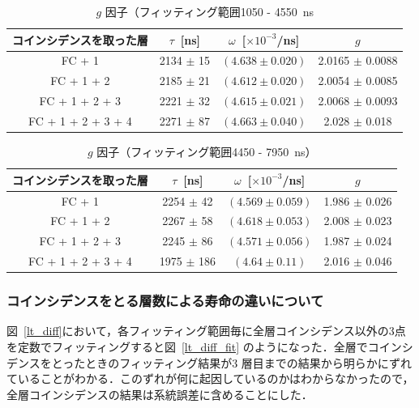 \begin{table}[H]
\caption{$g$ 因子（フィッティング範囲1050 - 4550~ns }
\label{fitrange3}
\centering
\begin{tabular}{cccc}\toprule
コインシデンスを取った層 & $\tau$~[ns] & $\omega$~[$\times 10^{-3}$/ns] & $g$ \\ \midrule
FC + 1 & 2134 $\pm$ 15 & $(4.638 \pm 0.020) $ & 2.0165 $\pm$ 0.0088 \\
FC + 1 + 2 & 2185 $\pm$ 21 & $(4.612 \pm 0.020) $ & 2.0054 $\pm$ 0.0085 \\
FC + 1 + 2 + 3 & 2221 $\pm$ 32 & $(4.615 \pm 0.021) $ & 2.0068 $\pm$ 0.0093\\
FC + 1 + 2 + 3 + 4 & 2271 $\pm$ 87 & $(4.663 \pm 0.040) $ & 2.028 $\pm$ 0.018 \\ \bottomrule
\end{tabular}
\end{table}%

\begin{table}[H]
\caption{$g$ 因子（フィッティング範囲4450 - 7950~ns） }
\label{fitrange4}
\centering
\begin{tabular}{cccc}\toprule
コインシデンスを取った層 & $\tau$~[ns] & $\omega$~[$\times 10^{-3}$/ns] & $g$ \\ \midrule
FC + 1 & 2254 $\pm$ 42 & $(4.569 \pm 0.059) $ & 1.986 $\pm$ 0.026 \\
FC + 1 + 2 & 2267 $\pm$ 58 & $(4.618 \pm 0.053) $ & 2.008 $\pm$ 0.023 \\
FC + 1 + 2 + 3 & 2245 $\pm$ 86 & $(4.571 \pm 0.056) $ & 1.987 $\pm$ 0.024\\
FC + 1 + 2 + 3 + 4 & 1975 $\pm$ 186& $(4.64 \pm 0.11) $ & 2.016 $\pm$ 0.046 \\ \bottomrule
\end{tabular}
\end{table}%

\subsubsection{コインシデンスをとる層数による寿命の違いについて}
図~\ref{lt_diff}において，各フィッティング範囲毎に全層コインシデンス以外の3点を定数でフィッティングすると図~\ref{lt_diff_fit} のようになった．全層でコインシデンスをとったときのフィッティング結果が3 層目までの結果から明らかにずれていることがわかる．このずれが何に起因しているのかはわからなかったので，全層コインシデンスの結果は系統誤差に含めることにした．

